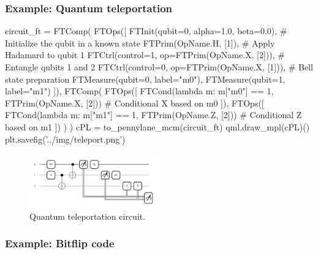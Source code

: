\subsubsection{Example: Quantum teleportation}

  \begin{python}
  circuit_ft = FTComp(
    FTOps([
      FTInit(qubit=0, alpha=1.0, beta=0.0),         # Initialize the qubit in a known state
      FTPrim(OpName.H, [1]),                        # Apply Hadamard to qubit 1
      FTCtrl(control=1, op=FTPrim(OpName.X, [2])),  # Entangle qubits 1 and 2
      FTCtrl(control=0, op=FTPrim(OpName.X, [1])),  # Bell state preparation
      FTMeasure(qubit=0, label="m0"),
      FTMeasure(qubit=1, label="m1")
    ]),
    FTComp(
      FTOps([
        FTCond(lambda m: m["m0"] == 1, FTPrim(OpName.X, [2]))  # Conditional X based on m0
      ]),
      FTOps([
        FTCond(lambda m: m["m1"] == 1, FTPrim(OpName.Z, [2]))  # Conditional Z based on m1
      ])
    )
  )
  cPL = to_pennylane_mcm(circuit_ft)
  qml.draw_mpl(cPL)()
  plt.savefig('../img/teleport.png')
  \end{python}

\begin{figure}[h!]
  \centering
  \includegraphics[width=0.5\textwidth]{../img/teleport.png}
  \caption{Quantum teleportation circuit.}
  \label{fig:teleport}
\end{figure}


\subsubsection{Example: Bitflip code}

